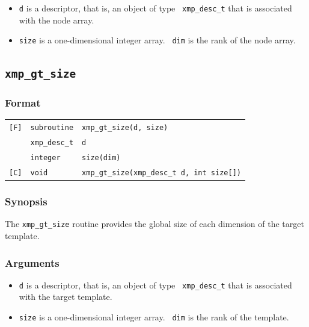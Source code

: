 \begin{itemize}
 \item {\tt d} is a descriptor, that is, an object of type {\tt
       xmp\_desc\_t} that is associated with the node array.
 \item {\tt size} is a one-dimensional integer array. {\tt
       dim} is the rank of the node array.
\end{itemize}

\subsection{\tt xmp\_gt\_size}

\subsubsection*{Format}

\begin{tabular}{lll}

\verb![F]!& {\tt subroutine}& {\tt xmp\_gt\_size(d, size)}\\
          & {\tt xmp\_desc\_t} & {\tt d}\\
          & {\tt integer} & {\tt size(dim)}\\

\verb![C]!&  {\tt void}& {\tt xmp\_gt\_size(xmp\_desc\_t d, int size[])}\\

\end{tabular}

\subsubsection*{Synopsis}

The {\tt xmp\_gt\_size} routine provides the global size of each
dimension of the target template.

\subsubsection*{Arguments}

\begin{itemize}
 \item {\tt d} is a descriptor, that is, an object of type {\tt
       xmp\_desc\_t} that is associated with the target template.
 \item {\tt size} is a one-dimensional integer array. {\tt
       dim} is the rank of the template.
\end{itemize}

